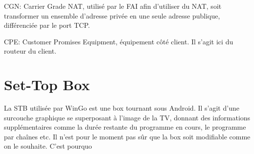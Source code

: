 CGN: Carrier Grade NAT, utilisé par le FAI afin d'utiliser du NAT, soit transformer un ensemble d'adresse privée en une seule adresse publique, différenciée par le port TCP.

CPE: Customer Promises Equipment, équipement côté client. Il s'agit ici du routeur du client.

\section{Set-Top Box}

La STB utilisée par WinGo est une box tournant sous Android. Il s'agit d'une surcouche graphique se superposant à l'image de la TV, donnant des informations supplémentaires comme la durée restante du programme en cours, le programme par chaînes etc. Il n'est pour le moment pas sûr que la box soit modifiable comme on le souhaite. C'est pourquo



